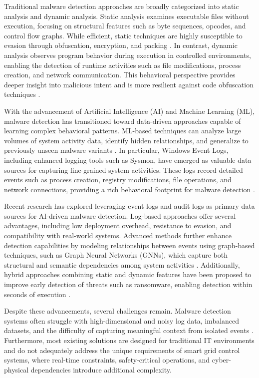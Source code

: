 \documentclass[conference]{IEEEtran}
\begin{document}
Traditional malware detection approaches are broadly categorized into static analysis and dynamic analysis. Static analysis examines executable files without execution, focusing on structural features such as byte sequences, opcodes, and control flow graphs. While efficient, static techniques are highly susceptible to evasion through obfuscation, encryption, and packing \cite{zhen2025}. In contrast, dynamic analysis observes program behavior during execution in controlled environments, enabling the detection of runtime activities such as file modifications, process creation, and network communication. This behavioral perspective provides deeper insight into malicious intent and is more resilient against code obfuscation techniques \cite{onal2025}.

With the advancement of Artificial Intelligence (AI) and Machine Learning (ML), malware detection has transitioned toward data-driven approaches capable of learning complex behavioral patterns. ML-based techniques can analyze large volumes of system activity data, identify hidden relationships, and generalize to previously unseen malware variants \cite{onal2025}. In particular, Windows Event Logs, including enhanced logging tools such as Sysmon, have emerged as valuable data sources for capturing fine-grained system activities. These logs record detailed events such as process creation, registry modifications, file operations, and network connections, providing a rich behavioral footprint for malware detection \cite{achmad2025}.

Recent research has explored leveraging event logs and audit logs as primary data sources for AI-driven malware detection. Log-based approaches offer several advantages, including low deployment overhead, resistance to evasion, and compatibility with real-world systems. Advanced methods further enhance detection capabilities by modeling relationships between events using graph-based techniques, such as Graph Neural Networks (GNNs), which capture both structural and semantic dependencies among system activities \cite{zhen2025}. Additionally, hybrid approaches combining static and dynamic features have been proposed to improve early detection of threats such as ransomware, enabling detection within seconds of execution \cite{ayub2023}.

Despite these advancements, several challenges remain. Malware detection systems often struggle with high-dimensional and noisy log data, imbalanced datasets, and the difficulty of capturing meaningful context from isolated events \cite{chen2022}. Furthermore, most existing solutions are designed for traditional IT environments and do not adequately address the unique requirements of smart grid control systems, where real-time constraints, safety-critical operations, and cyber-physical dependencies introduce additional complexity.
\end{document}
